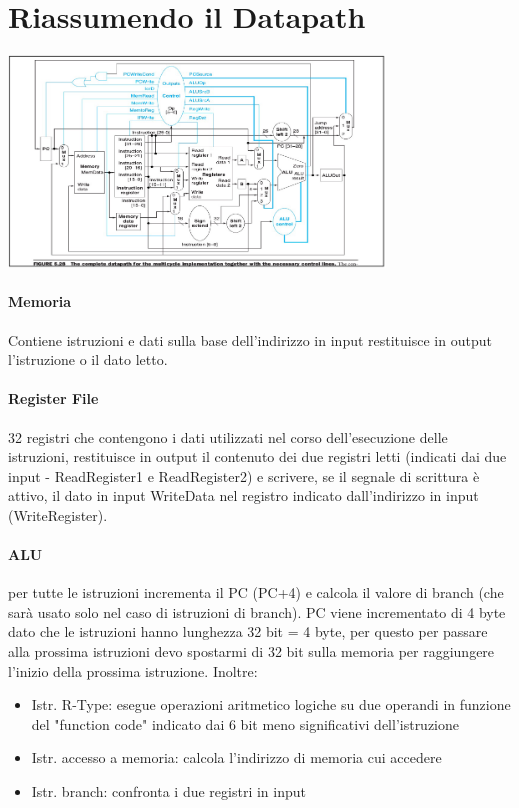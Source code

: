 \documentclass[12pt, a4paper, openany]{book}
\begin{document}
\section{Riassumendo il Datapath}
\begin{center}
    \includegraphics[width=100mm, scale=0.5]{Datapath.png}    
\end{center}
\paragraph*{Memoria} Contiene istruzioni e dati sulla base dell'indirizzo in input
restituisce in output l'istruzione o il dato letto.
\paragraph*{Register File} 32 registri che contengono i dati utilizzati nel corso
dell'esecuzione delle istruzioni, restituisce in output il contenuto dei due registri
letti (indicati dai due input - ReadRegister1 e ReadRegister2) e scrivere, se il segnale
di scrittura è attivo, il dato in input WriteData nel registro indicato dall'indirizzo
in input (WriteRegister).

\paragraph*{ALU} per tutte le istruzioni incrementa il PC (PC+4) e calcola il valore
di branch (che sarà usato solo nel caso di istruzioni di branch).
PC viene incrementato di 4 byte dato che le istruzioni hanno lunghezza 32 bit = 4 byte,
per questo per passare alla prossima istruzioni devo spostarmi di 32 bit sulla memoria
per raggiungere l'inizio della prossima istruzione.
Inoltre:
\begin{itemize}
    \item Istr. R-Type: esegue operazioni aritmetico logiche su due operandi in funzione
    del "function code" indicato dai 6 bit meno significativi dell'istruzione
    \item Istr. accesso a memoria: calcola l'indirizzo di memoria cui accedere
    \item Istr. branch: confronta i due registri in input
\end{itemize}
\end{document}
